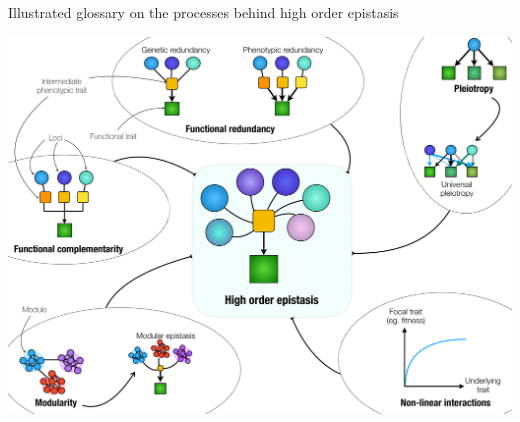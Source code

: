 
\begin{mybox}{\begin{Note-box}
\label{Box-Glossary-CompInt}Illustrated glossary on the processes behind high order epistasis\end{Note-box}}
\onehalfspacing
\begin{center}
    \includegraphics[scale=0.4,trim=0cm 0cm 0cm 0cm,clip]{pics/Epistasis/Genetic-interactions.pdf}

\end{center}
\end{mybox}
